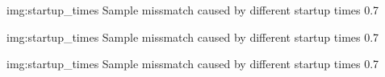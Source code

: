              {img:startup_times}
             {Sample missmatch caused by different startup times}
             {0.7}

             {img:startup_times}
             {Sample missmatch caused by different startup times}
             {0.7}

             {img:startup_times}
             {Sample missmatch caused by different startup times}
             {0.7}

